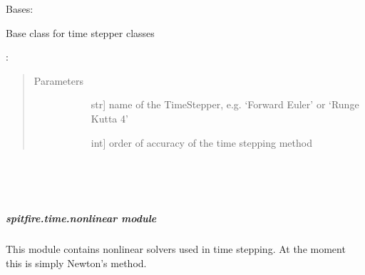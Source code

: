 \documentclass[letterpaper,10pt,english]{sphinxmanual}
\begin{document}
\begin{fulllineitems}
\label{\detokenize{spitfire.time.methods:spitfire.time.methods.TimeStepper}}
Bases: 

Base class for time stepper classes

:
\begin{quote}\begin{description}
\item[{Parameters}] \leavevmode\begin{description}
\item[{}] \leavevmode{[}str{]}
name of the TimeStepper, e.g. ‘Forward Euler’ or ‘Runge Kutta 4’

\item[{}] \leavevmode{[}int{]}
order of accuracy of the time stepping method

\end{description}

\end{description}\end{quote}

\begin{fulllineitems}
\label{\detokenize{spitfire.time.methods:spitfire.time.methods.TimeStepper.name}}~
\end{fulllineitems}


\begin{fulllineitems}
\label{\detokenize{spitfire.time.methods:spitfire.time.methods.TimeStepper.order}}~
\end{fulllineitems}


\end{fulllineitems}



\subparagraph{spitfire.time.nonlinear module}
\label{\detokenize{spitfire.time.nonlinear:module-spitfire.time.nonlinear}}\label{\detokenize{spitfire.time.nonlinear:spitfire-time-nonlinear-module}}\label{\detokenize{spitfire.time.nonlinear::doc}}
This module contains nonlinear solvers used in time stepping.
At the moment this is simply Newton’s method.
\end{document}
